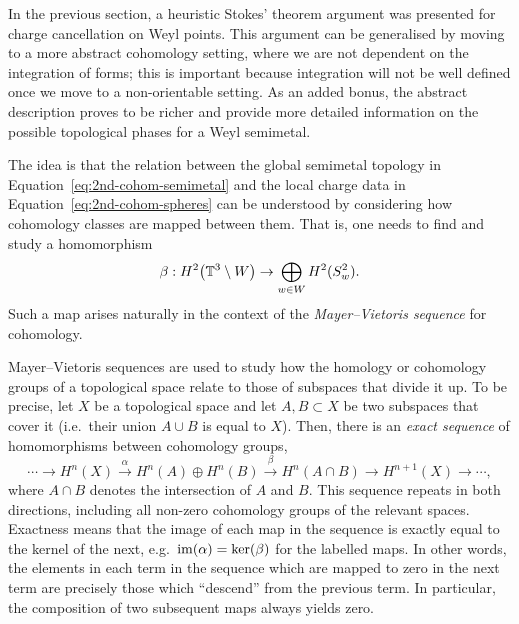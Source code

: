 In the previous section, a heuristic Stokes' theorem argument was presented for charge cancellation on Weyl points. This argument can be generalised by moving to a more abstract cohomology setting, where we are not dependent on the integration of forms; this is important because integration will not be well defined once we move to a non-orientable setting. As an added bonus, the abstract description proves to be richer and provide more detailed information on the possible topological phases for a Weyl semimetal.

The idea is that the relation between the global semimetal topology in Equation~\eqref{eq:2nd-cohom-semimetal} and the local charge data in Equation~\eqref{eq:2nd-cohom-spheres} can be understood by considering how cohomology classes are mapped between them. That is, one needs to find and study a homomorphism
\begin{equation*}
	\beta: H^2\big(\mathbb{T}^3\setminus W\big) \to \bigoplus_{w\in W} H^2(S_w^2).
\end{equation*}
Such a map arises naturally in the context of the \emph{Mayer--Vietoris sequence} for cohomology.

Mayer--Vietoris sequences are used to study how the homology or cohomology groups of a topological space relate to those of subspaces that divide it up. To be precise, let $X$ be a topological space and let $A,B\subset X$ be two subspaces that cover it (i.e.\ their union $A\cup B$ is equal to $X$). Then, there is an \emph{exact sequence} of homomorphisms between cohomology groups,
\begin{equation*}
	\cdots \to H^n(X) \overset{\alpha}{\to} H^n(A)\oplus H^n(B) \overset{\beta}{\to} H^n(A\cap B) \to H^{n+1}(X) \to \cdots,
\end{equation*}
where $A\cap B$ denotes the intersection of $A$ and $B$. This sequence repeats in both directions, including all non-zero cohomology groups of the relevant spaces. Exactness means that the image of each map in the sequence is exactly equal to the kernel of the next, e.g.\ $\operatorname{im}(\alpha)=\ker(\beta)$ for the labelled maps. In other words, the elements in each term in the sequence which are mapped to zero in the next term are precisely those which ``descend'' from the previous term. In particular, the composition of two subsequent maps always yields zero.


